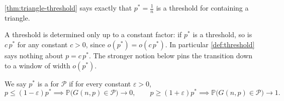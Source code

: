 \begin{center}
\end{center}

\begin{eg}\label{eg:triangle-threshold}
    \autoref{thm:triangle-threshold} says exactly that \(p^{*} = \frac{1}{n}\) is a threshold for containing a triangle.
\end{eg}

A threshold is determined only up to a constant factor: if \(p^{*}\) is a threshold, so is \(c\,p^{*}\) for any constant \(c > 0\), since \(o(p^{*}) = o(c\,p^{*})\). In particular \autoref{def:threshold} says nothing about \(p = c\,p^{*}\). The stronger notion below pins the transition down to a window of width \(o(p^{*})\).

\begin{definition}\label{def:sharp-threshold}
    We say \(p^{*}\) is a  for \(\mathcal{P}\) if for every constant \(\varepsilon > 0\),
    \[
        p \le (1-\varepsilon) p^{*} \implies \mathbb{P}\bigl( G(n,p) \in \mathcal{P} \bigr) \to 0,
        \qquad
        p \ge (1+\varepsilon) p^{*} \implies \mathbb{P}\bigl( G(n,p) \in \mathcal{P} \bigr) \to 1 .
    \]
\end{definition}

